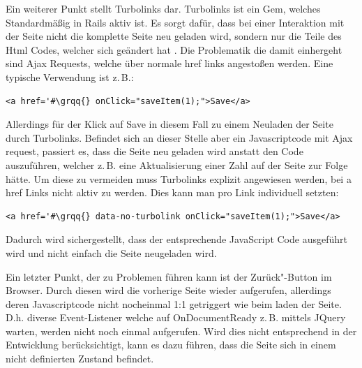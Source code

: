 Ein weiterer Punkt stellt Turbolinks dar. Turbolinks ist ein Gem, welches Standardmäßig in Rails aktiv ist. Es sorgt dafür, dass bei einer Interaktion mit der Seite nicht die komplette Seite neu geladen wird, sondern nur die Teile des Html Codes, welcher sich geändert hat \cite{Gamble.2013}. Die Problematik die damit einhergeht sind Ajax Requests, welche über normale href links angestoßen werden. Eine typische Verwendung ist z.\,B.:
\lstset{
   language=Html
}

\begin{lstlisting}[caption=a href HTML Code, label=code:ch5:html01]
<a href='#\grqq{} onClick="saveItem(1);">Save</a>
\end{lstlisting}

Allerdings für der Klick auf \glqq Save\grqq{} in diesem Fall zu einem Neuladen der Seite durch Turbolinks. Befindet sich an dieser Stelle aber ein Javascriptcode mit Ajax request, passiert es, dass die Seite neu geladen wird anstatt den Code auszuführen, welcher z.\,B. eine Aktualisierung einer Zahl auf der Seite zur Folge hätte.
Um diese zu vermeiden muss Turbolinks explizit angewiesen werden, bei a href Links nicht aktiv zu werden. Dies kann man pro Link individuell setzten:

\begin{lstlisting}[caption=a href HTML Code - Turbolinks deaktiviert, label=code:ch5:html01]
<a href='#\grqq{} data-no-turbolink onClick="saveItem(1);">Save</a>
\end{lstlisting}

Dadurch wird sichergestellt, dass der entsprechende JavaScript Code ausgeführt wird und nicht einfach die Seite neugeladen wird.

Ein letzter Punkt, der zu Problemen führen kann ist der \glqq Zurück"-Button im Browser.
Durch diesen wird die vorherige Seite wieder aufgerufen, allerdings deren Javascriptcode nicht nocheinmal 1:1 getriggert wie beim laden der Seite. D.h. diverse Event-Listener welche auf \glqq OnDocumentReady\grqq{} z.\,B. mittels JQuery warten, werden nicht noch einmal aufgerufen. Wird dies nicht entsprechend in der Entwicklung berücksichtigt, kann es dazu führen, dass die Seite sich in einem nicht definierten Zustand befindet.

